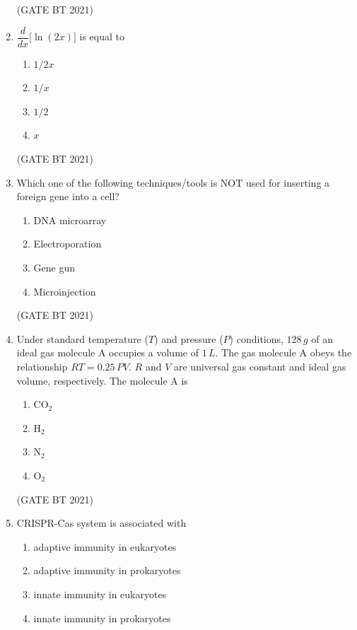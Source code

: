 \documentclass[journal,12pt,onecolumn]{IEEEtran}
\theoremstyle{remark}
\begin{document}
\begin{enumerate}
\hfill (GATE BT 2021)

\item $\dfrac{d}{dx}\big[\ln(2x)\big]$ is equal to

\begin{enumerate}
\item $1/2x$
\item $1/x$
\item $1/2$
\item $x$
\end{enumerate}

\hfill (GATE BT 2021)

\item Which one of the following techniques/tools is NOT used for inserting a foreign gene into a cell?

\begin{enumerate}
\item DNA microarray
\item Electroporation
\item Gene gun
\item Microinjection
\end{enumerate}

\hfill (GATE BT 2021)

\item Under standard temperature ($T$) and pressure ($P$) conditions, $128\,g$ of an ideal gas molecule A occupies a volume of $1\,L$. The gas molecule A obeys the relationship $RT = 0.25\,PV$. $R$ and $V$ are universal gas constant and ideal gas volume, respectively. The molecule A is

\begin{enumerate}
\item CO$_2$
\item H$_2$
\item N$_2$
\item O$_2$
\end{enumerate}

\hfill (GATE BT 2021)

\item CRISPR-Cas system is associated with

\begin{enumerate}
\item adaptive immunity in eukaryotes
\item adaptive immunity in prokaryotes
\item innate immunity in eukaryotes
\item innate immunity in prokaryotes
\end{enumerate}


\end{enumerate}
\end{document}
